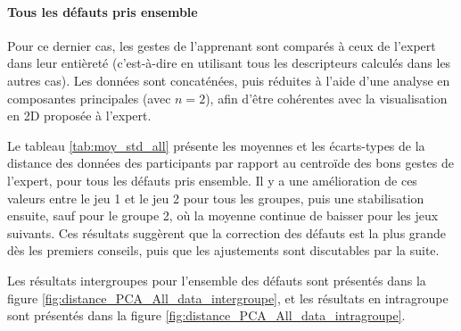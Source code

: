 \paragraph{Tous les défauts pris ensemble}

Pour ce dernier cas, les gestes de l'apprenant sont comparés à ceux de l'expert dans leur entièreté (c'est-à-dire en utilisant tous les descripteurs calculés dans les autres cas). Les données sont concaténées, puis réduites à l'aide d'une analyse en composantes principales (avec $n = 2$), afin d'être cohérentes avec la visualisation en 2D proposée à l'expert.

Le tableau \ref{tab:moy_std_all} présente les moyennes et les écarts-types de la distance des données des participants par rapport au centroïde des bons gestes de l'expert, pour tous les défauts pris ensemble. Il y a une amélioration de ces valeurs entre le jeu 1 et le jeu 2 pour tous les groupes, puis une stabilisation ensuite, sauf pour le groupe 2, où la moyenne continue de baisser pour les jeux suivants. Ces résultats suggèrent que la correction des défauts est la plus grande dès les premiers conseils, puis que les ajustements sont discutables par la suite.

\begin{table}[H]
\small
{}
\caption{Moyennes et écarts-types des données des apprenants (tous les défauts).}
\label{tab:moy_std_all}
\end{table}

Les résultats intergroupes pour l'ensemble des défauts sont présentés dans la figure \ref{fig:distance_PCA_All_data_intergroupe}, et les résultats en intragroupe sont présentés dans la figure \ref{fig:distance_PCA_All_data_intragroupe}.

